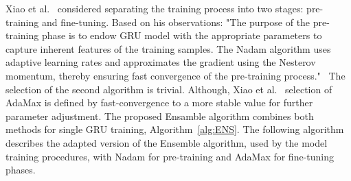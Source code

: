 %
%
Xiao et al.~\cite{xiao_accurate_2019} considered separating the training process into two stages: pre-training and fine-tuning.
Based on his observations: "The purpose of the pre-training phase is to endow GRU model with the appropriate parameters to capture inherent features of the training samples.
The Nadam algorithm uses adaptive learning rates and approximates the gradient using the Nesterov momentum, thereby ensuring fast convergence of the pre-training process."~\cite{xiao_accurate_2019}
The selection of the second algorithm is trivial.
Although, Xiao et al.~\cite{xiao_accurate_2019} selection of AdaMax is defined by fast-convergence to a more stable value for further parameter adjustment.
The proposed Ensamble algorithm combines both methods for single GRU training, Algorithm~\ref{alg:ENS}.
The following algorithm describes the adapted version of the Ensemble algorithm, used by the model training procedures, with Nadam for pre-training and AdaMax for fine-tuning phases.

